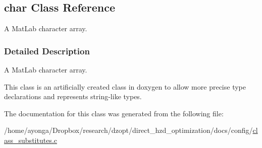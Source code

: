\hypertarget{classchar}{}\subsection{char Class Reference}
\label{classchar}


A Mat\+Lab character array.  




\subsubsection{Detailed Description}
A Mat\+Lab character array. 

This class is an artificially created class in doxygen to allow more precise type declarations and represents string-\/like types. 

The documentation for this class was generated from the following file\+:\begin{DoxyCompactItemize}
\item 
/home/ayonga/\+Dropbox/research/dzopt/direct\+\_\+hzd\+\_\+optimization/docs/config/\hyperlink{class__substitutes_8c}{class\+\_\+substitutes.\+c}\end{DoxyCompactItemize}
